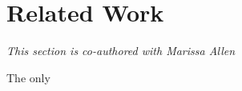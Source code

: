 \section{Related Work}\label{related-work}

\emph{This section is co-authored with Marissa Allen}

The only
